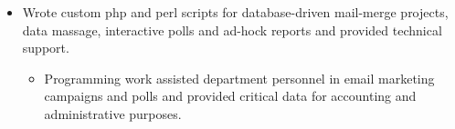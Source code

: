 \documentclass[11pt,a4paper,sans]{moderncv}   %
\begin{document}
{\begin{itemize}
\begin{itemize}
    \begin{itemize}%
    \item Homegrown content management systems supported
      cross-departmental contests and collaborative sites and
      features such as aggregate reporting target-driven email.
    \end{itemize}
  \item Wrote custom php and perl scripts for database-driven
    mail-merge projects, data massage, interactive polls and
    ad-hock reports and provided technical support.
    \begin{itemize}%
    \item Programming work assisted department personnel in email marketing
      campaigns and polls and provided critical data for accounting and administrative purposes.
    \end{itemize}
  \end{itemize}
\end{itemize}
}
\end{document}
